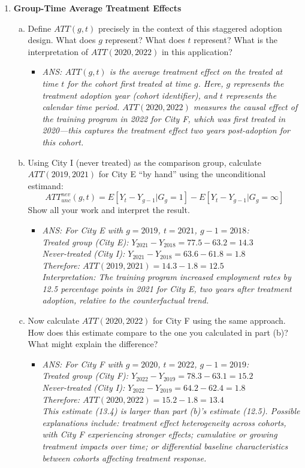 \documentclass[12pt,a4paper]{article}
\newcommand{\ans}[1]{\begin{itemize}\item[$\bullet$] \textit{ANS: #1}\end{itemize}}
\begin{document}
\begin{enumerate}
\item \textbf{Group-Time Average Treatment Effects}
\begin{enumerate}[(a)]
\item Define $ATT(g, t)$ precisely in the context of this staggered adoption design. What does $g$ represent? What does $t$ represent? What is the interpretation of $ATT(2020, 2022)$ in this application?
\ans{$ATT(g, t)$ is the average treatment effect on the treated at time $t$ for the cohort first treated at time $g$. Here, $g$ represents the treatment adoption year (cohort identifier), and $t$ represents the calendar time period. $ATT(2020, 2022)$ measures the causal effect of the training program in 2022 for City F, which was first treated in 2020---this captures the treatment effect two years post-adoption for this cohort.}

\item Using City I (never treated) as the comparison group, calculate $ATT(2019, 2021)$ for City E ``by hand'' using the unconditional estimand:
\begin{equation*}
ATT^{nev}_{unc}(g, t) = E[Y_t - Y_{g-1}|G_g = 1] - E[Y_t - Y_{g-1}|G_g = \infty]
\end{equation*}
Show all your work and interpret the result.
\ans{For City E with $g = 2019$, $t = 2021$, $g - 1 = 2018$:\\
Treated group (City E): $Y_{2021} - Y_{2018} = 77.5 - 63.2 = 14.3$\\
Never-treated (City I): $Y_{2021} - Y_{2018} = 63.6 - 61.8 = 1.8$\\
Therefore: $ATT(2019, 2021) = 14.3 - 1.8 = 12.5$\\
Interpretation: The training program increased employment rates by 12.5 percentage points in 2021 for City E, two years after treatment adoption, relative to the counterfactual trend.}

\item Now calculate $ATT(2020, 2022)$ for City F using the same approach. How does this estimate compare to the one you calculated in part (b)? What might explain the difference?
\ans{For City F with $g = 2020$, $t = 2022$, $g - 1 = 2019$:\\
Treated group (City F): $Y_{2022} - Y_{2019} = 78.3 - 63.1 = 15.2$\\
Never-treated (City I): $Y_{2022} - Y_{2019} = 64.2 - 62.4 = 1.8$\\
Therefore: $ATT(2020, 2022) = 15.2 - 1.8 = 13.4$\\
This estimate (13.4) is larger than part (b)'s estimate (12.5). Possible explanations include: treatment effect heterogeneity across cohorts, with City F experiencing stronger effects; cumulative or growing treatment impacts over time; or differential baseline characteristics between cohorts affecting treatment response.}
\end{enumerate}


\end{enumerate}
\end{document}
